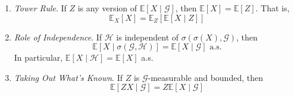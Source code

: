 \begin{lemma}
\begin{enumerate}
	    \item \label{thm:tower-rule} \textit{Tower Rule}. If $Z$ is any version of $\mathbb{E}[X \mid \mathcal{G}]$, then $\mathbb{E}[X] = \mathbb{E}[Z]$. That is, 
				\begin{equation}
					\mathbb{E}_X [X] = \mathbb{E}_Z [\mathbb{E}[X \mid Z]]
				\end{equation}
	    \item \label{thm:role-of-independence} \textit{Role of Independence}. If $\mathcal{H}$ is independent of $\sigma(\sigma(X), \mathcal{G})$, then 
	    \begin{equation}
	      \mathbb{E}[X \mid \sigma(\mathcal{G}, \mathcal{H})] = \mathbb{E}[X \mid \mathcal{G}] \text{ a.s.}
	    \end{equation}
	    In particular, $\mathbb{E}[X \mid \mathcal{H}] = \mathbb{E}[X]$ a.s. 
	    \item \label{thm:taking-out-whats-known} \textit{Taking Out What's Known}. If $Z$ is $\mathcal{G}$-measurable and bounded, then 
	    \begin{equation}
	      \mathbb{E}[Z X \mid \mathcal{G}] = Z \mathbb{E}[X \mid \mathcal{G}]
	    \end{equation}
	  \end{enumerate}
	\end{lemma}
